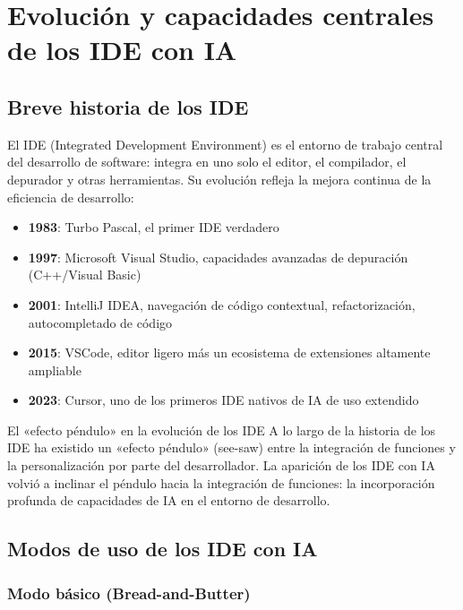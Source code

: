 \section{Evolución y capacidades centrales de los IDE con IA}

\subsection{Breve historia de los IDE}

El IDE (Integrated Development Environment) es el entorno de trabajo central del desarrollo de software: integra en uno solo el editor, el compilador, el depurador y otras herramientas. Su evolución refleja la mejora continua de la eficiencia de desarrollo:

\begin{itemize}
    \item \textbf{1983}: Turbo Pascal, el primer IDE verdadero
    \item \textbf{1997}: Microsoft Visual Studio, capacidades avanzadas de depuración (C++/Visual Basic)
    \item \textbf{2001}: IntelliJ IDEA, navegación de código contextual, refactorización, autocompletado de código
    \item \textbf{2015}: VSCode, editor ligero más un ecosistema de extensiones altamente ampliable
    \item \textbf{2023}: Cursor, uno de los primeros IDE nativos de IA de uso extendido
\end{itemize}

\begin{knowledgebox}{El «efecto péndulo» en la evolución de los IDE}
A lo largo de la historia de los IDE ha existido un «efecto péndulo» (see-saw) entre la integración de funciones y la personalización por parte del desarrollador. La aparición de los IDE con IA volvió a inclinar el péndulo hacia la integración de funciones: la incorporación profunda de capacidades de IA en el entorno de desarrollo.
\end{knowledgebox}

\subsection{Modos de uso de los IDE con IA}

\subsubsection{Modo básico (Bread-and-Butter)}

